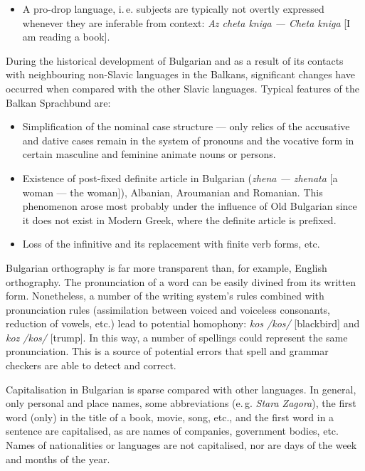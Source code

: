 \documentclass[]{../../metanetpaper}
\begin{document}
\begin{multicols}{2}
\begin{itemize}
\item A pro-drop language, i.\,e. subjects are typically not overtly expressed whenever they are inferable from context: \textit{{Az cheta kniga — Cheta kniga}} [I am reading a book]. 
\end{itemize}

During the historical development of Bulgarian and as a result of its contacts with neighbouring non-Slavic languages in the Balkans, significant changes have occurred when compared with the other Slavic languages. Typical features of the Balkan Sprachbund are:
\begin{itemize}
\item Simplification of the nominal case structure — only relics of the accusative and dative cases remain in the system of pronouns and the vocative form in certain masculine and feminine animate nouns or persons.

\item Existence of post-fixed definite article in Bulgarian (\textit{{zhena — zhenata}} [a woman — the woman]), Albanian, Aroumanian and Romanian. This phenomenon arose most probably under the influence of Old Bulgarian since it does not exist in Modern Greek, where the definite article is prefixed.

\item Loss of the infinitive and its replacement with finite verb forms, etc. 
\end{itemize}

Bulgarian orthography is far more transparent than, for example, English orthography. The pronunciation of a word can be easily divined from its written form. Nonetheless, a number of the writing system's rules combined with pronunciation rules (assimilation between voiced and voiceless consonants, reduction of vowels, etc.) lead to potential homophony: \textit{{kos} /kos/} [blackbird] and \textit{{koz /kos/}} [trump]. In this way, a number of spellings could represent the same pronunciation. This is a source of potential errors that spell and grammar checkers are able to detect and correct.

Capitalisation in Bulgarian is sparse compared with other languages. In general, only personal and place names, some abbreviations (e.\,g. \textit{Stara Zagora}), the first word (only) in the title of a book, movie, song, etc., and the first word in a sentence are capitalised, as are names of companies, government bodies, etc. Names of nationalities or languages are not capitalised, nor are days of the week and months of the year.
 

\end{multicols}
\end{document}
